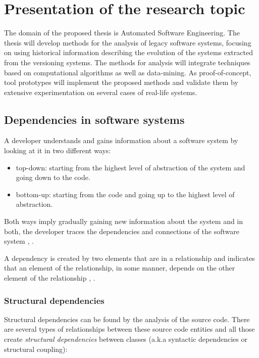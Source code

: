 \documentclass[12pt]{mitthesis}
\begin{document}
\tableofcontents

\pagestyle{plain}

\chapter{Presentation of the research topic}

The domain of the proposed thesis is Automated Software Engineering. The thesis will develop methods for the analysis of legacy software systems, focusing on using historical information describing the evolution of the systems extracted from the versioning systems. 
The methods for analysis will integrate techniques based on computational algorithms as well as data-mining. As proof-of-concept, tool prototypes will implement the proposed methods and validate them by extensive experimentation on several cases of real-life systems.

\section{Dependencies in software systems}
A developer understands and gains information about a software system by looking at it in two different ways: 
\begin{itemize}
	\item top-down: starting from the highest level of abstraction of the system and going down to the code.
	\item bottom-up: starting from the code and going up to the highest level of abstraction.
\end{itemize}

Both ways imply gradually gaining new information about the system and in both, the developer traces the dependencies and connections of the software system \cite{Wilde90understandingprogram}, \cite{341244}.

A dependency is created by two elements that are in a relationship and indicates that an element of the relationship, in some manner, depends on the other element of the relationship \cite{Booch:2004:OAD:975416}, \cite{Cataldo2009SoftwareDW}.

\subsection{Structural dependencies}
Structural dependencies can be found by the analysis of the source code.
There are several types of relationships between these source code entities and all those create \textit{structural dependencies} between classes (a.k.a syntactic dependencies or structural coupling):
\end{document}

